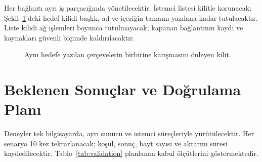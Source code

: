 \documentclass[12pt,oneside,a4paper]{article}
\begin{document}
Her bağlantı ayrı iş parçacığında yönetilecektir. İstemci listesi
kilitle korunacak; Şekil~\ref{fig:concurrency}'deki hedef kilidi
başlık, ad ve içeriğin tamamı yazılana kadar tutulacaktır.
Liste kilidi ağ işlemleri boyunca tutulmayacak; kapanan
bağlantının kaydı ve kaynakları güvenli biçimde kaldırılacaktır.

\begin{figure}[H]
\centering
{}
\caption{Aynı hedefe yazılan çerçevelerin birbirine karışmasını önleyen kilit.}
\label{fig:concurrency}
\end{figure}

\clearpage
\section{Beklenen Sonuçlar ve Doğrulama Planı}
Deneyler tek bilgisayarda, ayrı sunucu ve istemci süreçleriyle
yürütülecektir. Her senaryo 10 kez tekrarlanacak; koşul, sonuç,
bayt sayısı ve aktarım süresi kaydedilecektir. Tablo~\ref{tab:validation}
planlanan kabul ölçütlerini göstermektedir.
\end{document}
